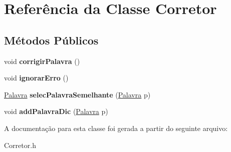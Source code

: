 \hypertarget{classCorretor}{}\section{Referência da Classe Corretor}
\label{classCorretor}
\subsection*{Métodos Públicos}
\begin{DoxyCompactItemize}
\item 
\mbox{\label{classCorretor_ad8c21144334f38187ba7e7f5c893c0ed}} 
void {\bfseries corrigir\+Palavra} ()
\item 
\mbox{\label{classCorretor_abe691ab7e28b0c628300afa7076c1fe7}} 
void {\bfseries ignorar\+Erro} ()
\item 
\mbox{\label{classCorretor_ac5b32fd4f27c6f2221f3b8ff9188f4b7}} 
\hyperlink{classPalavra}{Palavra} {\bfseries selec\+Palavra\+Semelhante} (\hyperlink{classPalavra}{Palavra} p)
\item 
\mbox{\label{classCorretor_ad43d884ea23584034efd602e9fc299cc}} 
void {\bfseries add\+Palavra\+Dic} (\hyperlink{classPalavra}{Palavra} p)
\end{DoxyCompactItemize}


A documentação para esta classe foi gerada a partir do seguinte arquivo\+:\begin{DoxyCompactItemize}
\item 
Corretor.\+h\end{DoxyCompactItemize}
